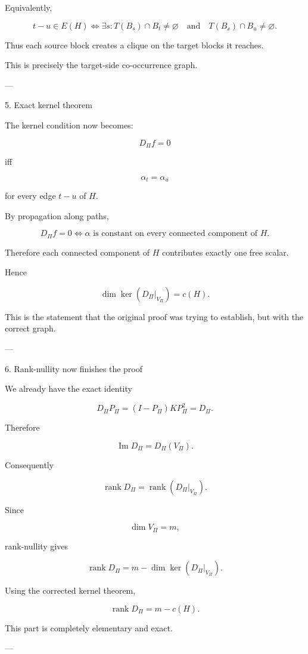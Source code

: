 Equivalently,

\[
\boxed{
t-u\in E(H)
\iff
\exists s:
T(B_s)\cap B_t\neq\varnothing
\quad\text{and}\quad
T(B_s)\cap B_u\neq\varnothing.
}
\]

Thus each source block creates a clique on the target blocks it reaches.

This is precisely the target-side co-occurrence graph.


---

5. Exact kernel theorem

The kernel condition now becomes:

\[
D_\Pi f=0
\]

iff

\[
\alpha_t=\alpha_u
\]

for every edge \(t-u\) of \(H\).

By propagation along paths,

\[
\boxed{
D_\Pi f=0
\iff
\alpha
\text{ is constant on every connected component of }H.
}
\]

Therefore each connected component of \(H\) contributes exactly one free scalar.

Hence

\[
\boxed{
\dim\ker(D_\Pi|_{V_\Pi})=c(H).
}
\]

This is the statement that the original proof was trying to establish, but with the correct graph.


---

6. Rank-nullity now finishes the proof

We already have the exact identity

\[
D_\Pi P_\Pi
=
(I-P_\Pi)KP_\Pi^2
=
D_\Pi.
\]

Therefore

\[
\operatorname{Im}D_\Pi
=
D_\Pi(V_\Pi).
\]

Consequently

\[
\operatorname{rank}D_\Pi
=
\operatorname{rank}(D_\Pi|_{V_\Pi}).
\]

Since

\[
\dim V_\Pi=m,
\]

rank-nullity gives

\[
\operatorname{rank}D_\Pi
=
m-\dim\ker(D_\Pi|_{V_\Pi}).
\]

Using the corrected kernel theorem,

\[
\boxed{
\operatorname{rank}D_\Pi=m-c(H).
}
\]

This part is completely elementary and exact.


---

